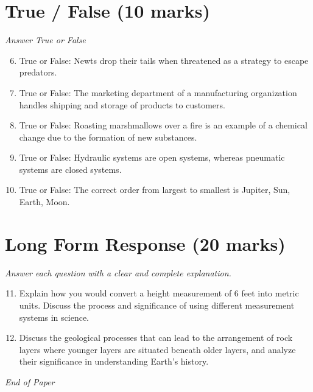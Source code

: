 \documentclass[12pt]{article}
\begin{document}
\section*{True / False (10 marks)}
\textit{Answer True or False}
\begin{enumerate}[label=\arabic*.]
\setcounter{enumi}{5}
\item True or False: Newts drop their tails when threatened as a strategy to escape predators.
\item True or False: The marketing department of a manufacturing organization handles shipping and storage of products to customers.
\item True or False: Roasting marshmallows over a fire is an example of a chemical change due to the formation of new substances.
\item True or False: Hydraulic systems are open systems, whereas pneumatic systems are closed systems.
\item True or False: The correct order from largest to smallest is Jupiter, Sun, Earth, Moon.
\end{enumerate}

\section*{Long Form Response (20 marks)}
\textit{Answer each question with a clear and complete explanation.}
\begin{enumerate}[label=\arabic*.]
\setcounter{enumi}{10}
\item Explain how you would convert a height measurement of 6 feet into metric units. Discuss the process and significance of using different measurement systems in science.
\item Discuss the geological processes that can lead to the arrangement of rock layers where younger layers are situated beneath older layers, and analyze their significance in understanding Earth's history.
\end{enumerate}

\vfill
\noindent\textit{End of Paper}
\end{document}
